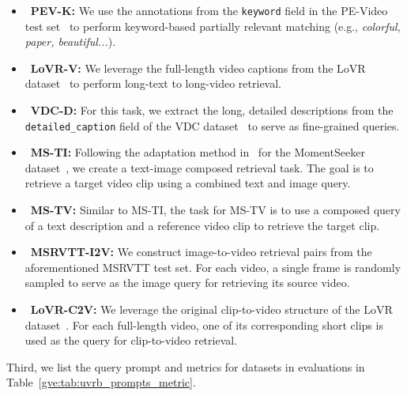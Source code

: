 \begin{itemize}
    \item~\textbf{PEV-K:} We use the annotations from the \texttt{keyword} field in the PE-Video test set~\cite{bolya2025perception} to perform keyword-based partially relevant matching (e.g., \textit{colorful, paper, beautiful...}).

    \item~\textbf{LoVR-V:} We leverage the full-length video captions from the LoVR dataset~\cite{cai2025lovr} to perform long-text to long-video retrieval.

    \item~\textbf{VDC-D:} For this task, we extract the long, detailed descriptions from the \texttt{detailed\_caption} field of the VDC dataset~\cite{chai2024auroracap} to serve as fine-grained queries.

    \item~\textbf{MS-TI:} Following the adaptation method in~\cite{meng2025vlm2vec} for the MomentSeeker dataset~\cite{yuan2025momentseeker}, we create a text-image composed retrieval task. The goal is to retrieve a target video clip using a combined text and image query.

    \item~\textbf{MS-TV:} Similar to MS-TI, the task for MS-TV is to use a composed query of a text description and a reference video clip to retrieve the target clip.

    \item~\textbf{MSRVTT-I2V:} We construct image-to-video retrieval pairs from the aforementioned MSRVTT test set. For each video, a single frame is randomly sampled to serve as the image query for retrieving its source video.

    \item~\textbf{LoVR-C2V:} We leverage the original clip-to-video structure of the LoVR dataset~\cite{cai2025lovr}. For each full-length video, one of its corresponding short clips is used as the query for clip-to-video retrieval.
\end{itemize}

Third, we list the query prompt and metrics for datasets in evaluations in Table~\ref{gve:tab:uvrb_prompts_metric}.

